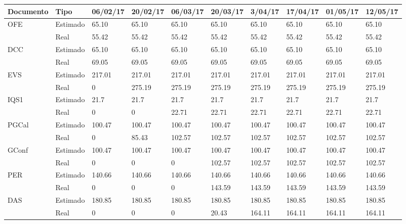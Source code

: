 \begin{table}[h]
\begin{center}
\begin{tabular}{ p{1.75cm}  p{1.25cm}  p{1.25cm} p{1.25cm}  p{1.25cm}  p{1.25cm}  p{1.25cm}  p{1.25cm} p{1.25cm} p{1.25cm}}

	Documento &  Tipo & 06/02/17 & 20/02/17 & 06/03/17 & 20/03/17 & 3/04/17 & 17/04/17 & 01/05/17 & 12/05/17\\ \hline \hline

	OFE & Estimado & 65.10 & 65.10 & 65.10 &  65.10 &  65.10 &  65.10 &  65.10 & 65.10 \\
	 		& Real & 55.42 & 55.42 & 55.42 & 55.42 & 55.42 & 55.42 & 55.42 & 55.42\\ \hline

		DCC & Estimado & 65.10 & 65.10 & 65.10 &  65.10 &  65.10 &  65.10 &  65.10 & 65.10 \\
	 			& Real & 69.05 & 69.05 & 69.05 & 69.05 & 69.05 & 69.05 & 69.05 & 69.05\\ \hline

		EVS & Estimado & 217.01 & 217.01 & 217.01 &  217.01&  217.01&  217.01&  217.01& 217.01\\
				& Real & 0 & 275.19 & 275.19 & 275.19 & 275.19 & 275.19 & 275.19 & 275.19\\ \hline

		IQS1 & Estimado & 21.7 & 21.7 & 21.7 &  21.7&  21.7&  21.7&  21.7& 21.7\\
	 			& Real & 0 & 0 & 22.71 & 22.71 & 22.71 & 22.71 & 22.71 & 22.71\\ \hline

	 PGCal & Estimado & 100.47 &  100.47 &  100.47 &  100.47&  100.47&  100.47&  100.47& 100.47\\
 	 			& Real & 0 & 85.43 & 102.57 &  102.57 &  102.57 &  102.57 &  102.57 & 102.57 \\ \hline

	 GConf & Estimado & 100.47 & 100.47 &  100.47  &  100.47 &  100.47 &  100.47 &  100.47 & 100.47 \\
 	 			& Real & 0 & 0 & 0 &  102.57 &  102.57 &  102.57 &  102.57 & 102.57 \\ \hline

	 PER & Estimado & 140.66 &  140.66  &  140.66  &  140.66 &  140.66 &  140.66 &  140.66 & 140.66 \\
 	 			& Real & 0 & 0 & 0 & 143.59 &  143.59 &  143.59 &  143.59 & 143.59 \\ \hline

	 DAS & Estimado & 180.85 &  180.85  &  180.85  &  180.85 &  180.85 &  180.85 &  180.85 & 180.85 \\
 	 			& Real & 0 & 0 & 0 & 20.43 &  164.11 &  164.11 &  164.11 & 164.11 \\ \hline


\end{tabular}
\end{center}
\end{table}
